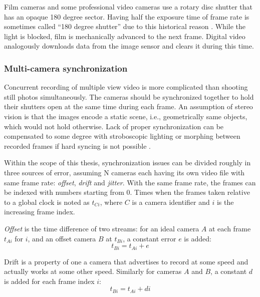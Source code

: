 Film cameras and some professional video cameras use a rotary disc shutter that has an opaque 180 degree sector.
Having half the exposure time of frame rate is sometimes called ``180 degree shutter'' due to this historical reason \cite[p.~37]{wilson2004anton}.
While the light is blocked, film is mechanically advanced to the next frame.
Digital video analogously downloads data from the image sensor and clears it during this time.


\subsubsection{Multi-camera synchronization} %


Concurrent recording of multiple view video is more complicated than shooting still photos simultaneously.
The cameras should be synchronized together to hold their shutters open at the same time during each frame.
An assumption of stereo vision is that the images encode a static scene, i.e., geometrically same objects, which would not hold otherwise.
Lack of proper synchronization can be compensated to some degree with stroboscopic lighting or morphing between recorded frames if hard syncing is not possible \cite{bradley2009synchronization}.

Within the scope of this thesis, synchronization issues can be divided roughly in three sources of error, assuming N cameras each having its own video file with same frame rate: \emph{offset}, \emph{drift} and \emph{jitter}.
With the same frame rate, the frames can be indexed with numbers starting from 0.
Times when the frames taken relative to a global clock is noted as $t_{Ci}$, where $C$ is a camera identifier and $i$ is the increasing frame index.

\emph{Offset} is the time difference of two streams: for an ideal camera $A$ at each frame $t_{Ai}$ for $i$, and an offset camera $B$ at $t_{Bi}$, a constant error $e$ is added:
\begin{equation} \label{eq:timeoffset}
	t_{Bi} = t_{Ai} + e
\end{equation}

Drift is a property of one a camera that advertises to record at some speed and actually works at some other speed.
Similarly for cameras $A$ and $B$, a constant $d$ is added for each frame index $i$:
\begin{equation} \label{eq:timedrift}
	t_{Bi} = t_{Ai} + d i
\end{equation}

